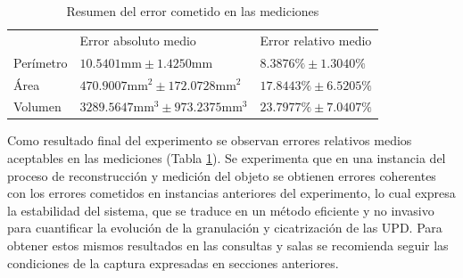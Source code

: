\begin{table}[ht]
	\centering
	\begin{tabular}{lll}
		\hhline{===}
		& Error absoluto medio & Error relativo medio\\
		\hhline{===}
		Perímetro & $10.5401\text{mm} \pm 1.4250\text{mm}$ & $8.3876\% \pm 1.3040\%$ \\ \hline
		Área & $470.9007\text{mm}^2 \pm 172.0728\text{mm}^2$ & $17.8443\% \pm 6.5205\%$\\ \hline
		Volumen & $3289.5647\text{mm}^3 \pm 973.2375\text{mm}^3$ & $23.7977\% \pm 7.0407\%$\\
		\hline
	\end{tabular}
	\caption{Resumen del error cometido en las mediciones}
	\label{tab:err}
\end{table}


Como resultado final del experimento se observan errores relativos medios aceptables en las mediciones (Tabla \ref{tab:err}). Se experimenta que en una instancia del proceso de reconstrucción y medición del objeto se obtienen errores coherentes con los errores cometidos en instancias anteriores del experimento, lo cual expresa la estabilidad del sistema, que se traduce en un método eficiente y no invasivo para cuantificar la evolución de la granulación y cicatrización de las UPD. Para obtener estos mismos resultados en las consultas y salas se recomienda seguir las condiciones de la captura expresadas en secciones anteriores. 
